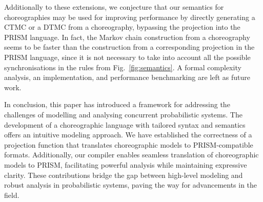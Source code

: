 Additionally to these extensions, we conjecture that our semantics for
choreographies may be used for improving performance by directly
generating a CTMC or a DTMC from a choreography, bypassing the
projection into the PRISM language. In fact, the Markov chain
construction from a choreography seems to be faster than the
construction from a corresponding projection in the PRISM language,
since it is not necessary to take into account all the possible
synchronisations in the rules from Fig.~\ref{fig:semantics}. A formal
complexity analysis, an implementation, and performance benchmarking
are left as future work.



In conclusion, this paper has introduced a framework for addressing
the challenges of modelling and analysing concurrent probabilistic
systems.
The development of a choreographic language with tailored syntax and
semantics offers an intuitive modeling approach. We have established
the correctness of a projection function that translates choreographic
models to PRISM-compatible formats. Additionally, our compiler enables
seamless translation of choreographic models to PRISM, facilitating
powerful analysis while maintaining expressive clarity. These
contributions bridge the gap between high-level modeling and robust
analysis in probabilistic systems, paving the way for advancements in
the field. 

